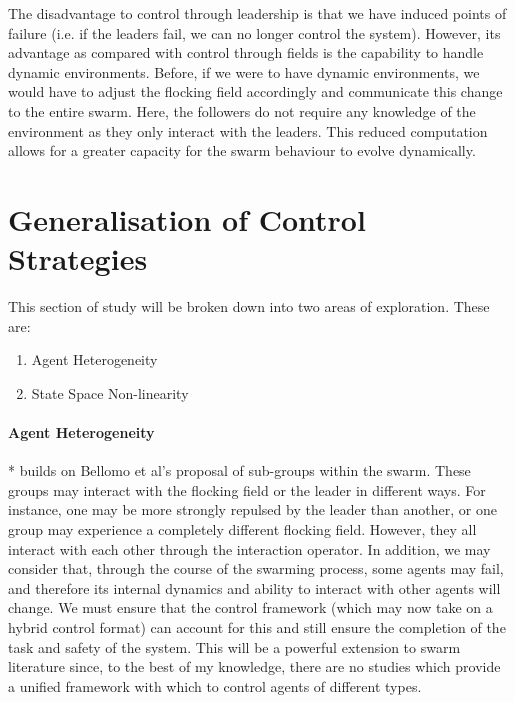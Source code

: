 \documentclass[../sample.tex]{subfiles}
\begin{document}
	The disadvantage to control through leadership is that we have induced points of failure (i.e.
	if the leaders fail, we can no longer control the system). However, its advantage as compared
	with control through fields is the capability to handle dynamic environments. Before, if we were
	to have dynamic environments, we would have to adjust the flocking field accordingly and
	communicate this change to the entire swarm. Here, the followers do not require any knowledge of
	the environment as they only interact with the leaders. This reduced computation allows for a
	greater capacity for the swarm behaviour to evolve dynamically.


	\section{Generalisation of Control Strategies} %
	\label{sec:generalisation_of_control_strategies}
	
	This section of study will be broken down into two areas of exploration. These are:

	\begin{enumerate}
		\item Agent Heterogeneity
		\item State Space Non-linearity
	\end{enumerate}

	\paragraph{Agent Heterogeneity} %
	\label{par:agent_heterogeneity}
	
	* builds on Bellomo et al's proposal of sub-groups within the swarm. These groups may interact with
	the flocking field or the leader in different ways. For instance, one may be more strongly repulsed
	by the leader than another, or one group may experience a completely different flocking field. However, they all interact with each other through the interaction operator. In addition,
	we may consider that, through the course of the swarming process, some agents may fail, and
	therefore its internal dynamics and ability to interact with other agents will change. We must
	ensure that the control framework (which may now take on a hybrid control \cite{Lygeros2004}
	format) can account for this and still ensure the completion of the task and safety of the system.
	This will be a powerful extension to swarm literature since, to the best of my knowledge, there are
	no studies which provide a unified framework with which to control agents of different types.
\end{document}
